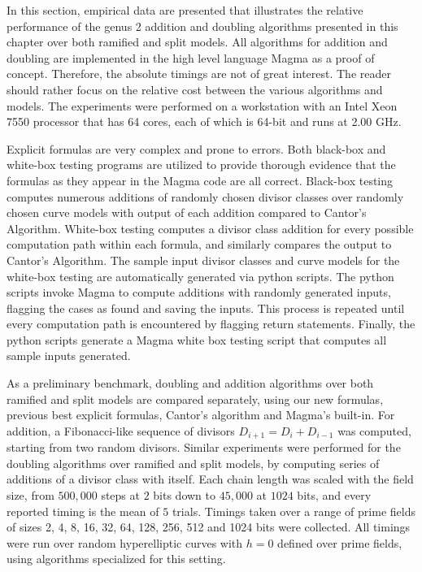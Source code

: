 In this section, empirical data are presented that illustrates the relative
performance of the genus 2 addition and doubling algorithms presented in this
chapter over both ramified and split models. All algorithms for addition and
doubling are implemented in the high level language Magma as a proof of concept.
Therefore, the absolute timings are not of great interest. The reader should
rather focus on the relative cost between the various algorithms and models. The
experiments were performed on a workstation with an Intel Xeon 7550 processor
that has 64 cores, each of which is 64-bit and runs at 2.00 GHz.

Explicit formulas are very complex and prone to errors. Both black-box
and white-box testing programs are utilized to provide thorough evidence that
the formulas as they appear in the Magma code are all correct. Black-box testing
computes numerous additions of randomly chosen divisor classes over randomly
chosen curve models with output of each addition compared to Cantor's Algorithm.
White-box testing computes a divisor class addition for every possible
computation path within each formula, and similarly compares the output to
Cantor's Algorithm. The sample input divisor classes and curve models for the
white-box testing are automatically generated via python scripts. The python
scripts invoke Magma to compute additions with randomly generated inputs,
flagging the cases as found and saving the inputs. This process is repeated
until every computation path is encountered by flagging return statements.
Finally, the python scripts generate a Magma white box testing script that
computes all sample inputs generated.

As a preliminary benchmark, doubling and addition algorithms over both ramified
and split models are compared separately, using our new formulas, previous best
explicit formulas, Cantor's algorithm and Magma's built-in. For addition, a
Fibonacci-like sequence of divisors $D_{i+1} = D_{i} + D_{i-1}$ was computed,
starting from two random divisors. Similar experiments were performed for the
doubling algorithms over ramified and split models, by computing series of
additions of a divisor class with itself. Each chain length was scaled with the
field size, from $500{,}000$ steps at $2$ bits down to $45{,}000$ at $1024$
bits, and every reported timing is the mean of $5$ trials. Timings taken over a
range of prime fields of sizes 2, 4, 8, 16, 32, 64, 128, 256, 512 and 1024 bits
were collected. All timings were run over random hyperelliptic curves with $h=0$
defined over prime fields, using algorithms specialized for this setting.

